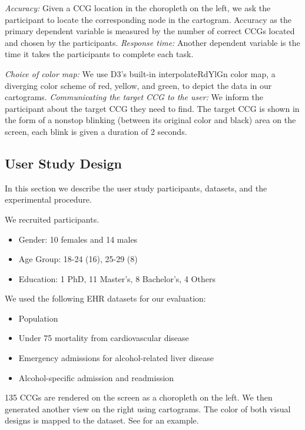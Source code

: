 \textit{Accuracy:} Given a CCG location in the choropleth on the left, we ask the participant to locate the corresponding node in the cartogram. Accuracy as the primary dependent variable is measured by the number of correct CCGs located and chosen by the participants. \textit{Response time:} Another dependent variable is the time it takes the participants to complete each task.

\textit{Choice of color map:} We use D3's built-in interpolateRdYlGn color map, a diverging color scheme of red, yellow, and green, to depict the data in our cartograms. \textit{Communicating the target CCG to the user:} We inform the participant about the target CCG they need to find. The target CCG is shown in the form of a nonstop blinking (between its original color and black) area on the screen, each blink is given a duration of 2 seconds.

\subsection{User Study Design}
In this section we describe the user study participants, datasets, and the experimental procedure.

 We recruited \pCount participants.

\begin{itemize}
    \item Gender: 10 females and 14 males
    \item Age Group: 18-24 (16), 25-29 (8)
    \item Education: 1 PhD, 11 Master's, 8 Bachelor's, 4 Others
\end{itemize}

 We used the following EHR datasets for our evaluation:

\begin{itemize}
    \item Population
    \item Under 75 mortality from cardiovascular disease
    \item Emergency admissions for alcohol-related liver disease
    \item Alcohol-specific admission and readmission
\end{itemize}

135 CCGs are rendered on the screen as a choropleth on the left. We then generated another view on the right using cartograms. The color of both visual designs is mapped to the dataset. See  for an example.

